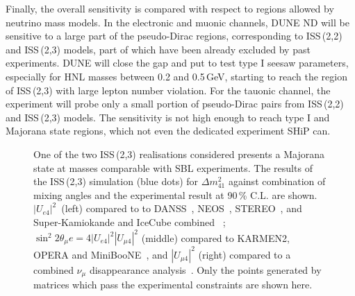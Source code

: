 Finally, the overall sensitivity is compared with respect to regions allowed by neutrino mass models.
In the electronic and muonic channels, DUNE ND will be sensitive to a large part of the pseudo-Dirac regions, %
corresponding to ISS\,(2,2) and ISS\,(2,3) models, %
part of which have been already excluded by past experiments.
DUNE will close the gap and put to test type I seesaw parameters, especially for HNL masses between 0.2 and 0.5\,GeV, %
starting to reach the region of ISS\,(2,3) with large lepton number violation.
For the tauonic channel, the experiment will probe only a small portion %
of pseudo-Dirac pairs from ISS\,(2,2) and ISS\,(2,3) models.
The sensitivity is not high enough to reach type I and Majorana state regions, which not even the dedicated experiment SHiP can.

\begin{figure}
	\centering
	{\resizebox{\linewidth}{!}{}}
	\caption[Comparison of ISS(2,3) with short baseline anomalies]%
		{One of the two ISS\,(2,3) realisations considered presents a Majorana state at masses comparable with SBL experiments.
		The results of the ISS\,(2,3) simulation (blue dots) for $\Delta m_{4 1}^2$ against combination of mixing angles and %
		the experimental result at 90\,\% C.L. are shown.
		$|U_{e 4}|^2$~(left) compared to %
		to DANSS~\cite{Alekseev:2018efk}, NEOS~\cite{Ko:2016owz}, STEREO~\cite{AlmazanMolina:2019qul}, %
		and Super-Kamiokande and IceCube combined ~\cite{Dentler:2018sju};
		\mbox{$\sin^2 2\theta{_\mu e} = 4|U_{e 4}|^2|U_{\mu 4}|^2$} (middle) compared to KARMEN2, OPERA and MiniBooNE~\cite{Aguilar-Arevalo:2018gpe},
		and $|U_{\mu 4}|^2$ (right) compared to a combined $\nu_\mu$ disappearance analysis~\cite{Dentler:2018sju}.
		Only the points generated by matrices which pass the experimental constraints are shown here.}
	\label{fig:sblosc}
\end{figure}

